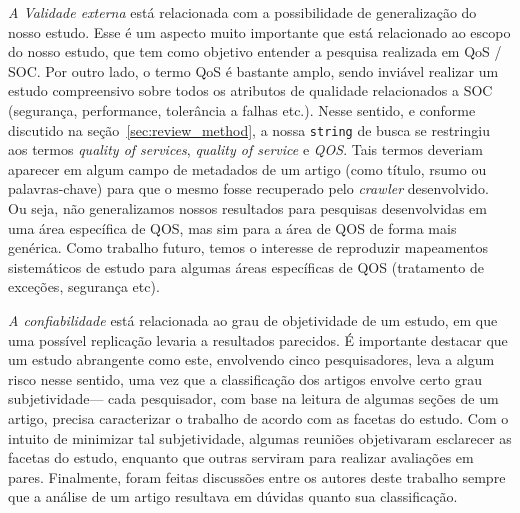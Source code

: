 \noindent
\emph{A Validade externa} est\'{a} relacionada com a possibilidade de
generaliza\c c\~{a}o do nosso estudo. Esse \'{e} um aspecto muito
importante que est\'{a} relacionado ao escopo do nosso estudo, que tem
como objetivo entender a pesquisa realizada em QoS / SOC. Por outro
lado, o termo QoS \'{e} bastante amplo, sendo invi\'{a}vel realizar
um estudo compreensivo sobre todos os atributos de qualidade
relacionados a SOC (seguran\c ca, performance, toler\^{a}ncia a falhas
etc.). Nesse sentido, e conforme discutido na se\c c\~{a}o~\ref{sec:review_method}, a
nossa \texttt{string} de busca se restringiu aos termos \emph{quality
  of services}, \emph{quality of service} e \emph{QOS}. Tais termos
deveriam aparecer em algum campo de metadados de um artigo (como
t\'{i}tulo, rsumo ou palavras-chave) para que o mesmo fosse recuperado pelo
\emph{crawler} desenvolvido. Ou seja, n\~{a}o generalizamos nossos
resultados para pesquisas desenvolvidas em uma \'{a}rea espec\'{i}fica de
QOS, mas sim para a \'{a}rea de QOS de forma mais gen\'{e}rica. Como
trabalho futuro, temos
o interesse de reproduzir mapeamentos sistem\'{a}ticos de estudo para
algumas \'{a}reas espec\'{i}ficas de QOS (tratamento de exce\c
c\~{o}es, seguran\c ca etc). 

\noindent
\emph{A confiabilidade} est\'{a} relacionada ao grau de objetividade de
um estudo, em que uma poss\'{i}vel replica\c c\~{a}o levaria a
resultados parecidos. \'{E} importante destacar que um estudo abrangente como este,
envolvendo cinco pesquisadores, leva a algum risco nesse sentido,
uma vez que a classifica\c c\~{a}o dos artigos envolve certo grau
subjetividade--- cada pesquisador, com base na leitura de algumas
se\c c\~{o}es de um artigo, precisa caracterizar o trabalho de acordo
com as facetas do estudo. Com o intuito de minimizar tal subjetividade,
algumas reuni\~{o}es objetivaram esclarecer as facetas do estudo,
enquanto que outras serviram para realizar avalia\c c\~{o}es em
pares. Finalmente, foram feitas discuss\~{o}es entre os autores deste
trabalho sempre que a an\'{a}lise de um artigo resultava em d\'{u}vidas
quanto sua classifica\c c\~{a}o. 